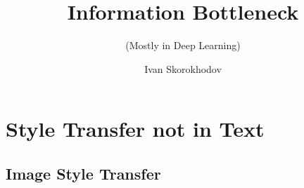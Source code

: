 \documentclass[10pt]{beamer}
\title{Information Bottleneck}
\subtitle{(Mostly in Deep Learning)}
\author{Ivan Skorokhodov}
\begin{document}
\begin{frame}
    \titlepage
\end{frame}





\section{Style Transfer not in Text}
\subsection{Image Style Transfer}
\end{document}
